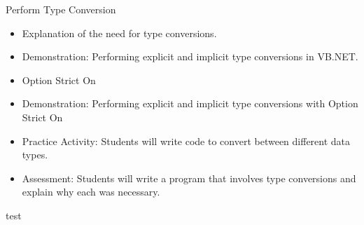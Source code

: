 \documentclass[main.tex]{subfiles}
\begin{document}
{Perform Type Conversion}
{ \begin{itemize}
  \item Explanation of the need for type conversions.
  \item Demonstration: Performing explicit and implicit type conversions in VB.NET.
  \item Option Strict On
  \item Demonstration: Performing explicit and implicit type conversions with Option Strict On
  \item Practice Activity: Students will write code to convert between different data types.
  \item Assessment: Students will write a program that involves type conversions and explain why each was necessary. 
\end{itemize}
}
{}
%
{test}
{
}
{}
\end{document}
